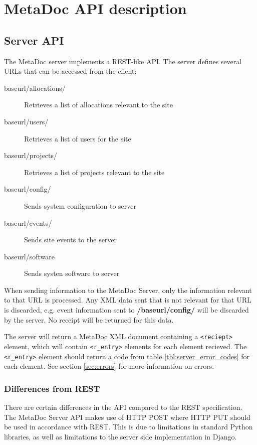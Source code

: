 \documentclass[titlepage, a4paper,10pt]{article}
\begin{document}
\section{MetaDoc API description}

\subsection{Server API}

The MetaDoc server implements a REST-like API. The server defines several URLs that can be accessed from the client:

\begin{description}
    \item[baseurl/allocations/] Retrieves a list of allocations relevant to the site
    \item[baseurl/users/] Retrieves a list of users for the site
    \item[baseurl/projects/] Retrieves a list of projects relevant to the site
    \item[baseurl/config/] Sends system configuration to server
    \item[baseurl/events/] Sends site events to the server
    \item[baseurl/software] Sends systen software to server
\end{description}

When sending information to the MetaDoc Server, only the information relevant to that URL is processed. Any XML data sent that is not relevant for that URL is discarded, e.g. event information sent to \textbf{/baseurl/config/} will be discarded by the server. No receipt will be returned for this data.  

The server will return a MetaDoc XML document containing a \texttt{<reciept>} element, which will contain \texttt{<r\_entry>} elements for each element recieved. The \texttt{<r\_entry>} element should return a code from table \ref{tbl:server_error_codes} for each element. See section \ref{sec:errors} for more information on errors. 

\subsubsection{Differences from REST}

There are certain differences in the API compared to the REST specification. The MetaDoc Server API makes use of HTTP POST where HTTP PUT should be used in accordance with REST. This is due to limitations in standard Python libraries, as well as limitations to the server side implementation in Django. 
\end{document}
